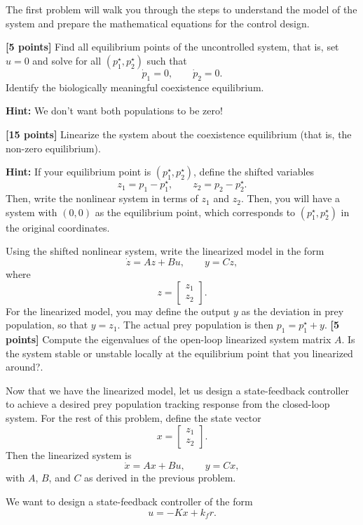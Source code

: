 \documentclass{ee122_pset}
\begin{document}
 The first problem will walk you through the steps to understand the model of the system and prepare the mathematical equations for the control design. 

\problempart \textbf{[5 points]} Find all equilibrium points of the uncontrolled system, that is, set \(u=0\) and solve for all \((p_1^\star,p_2^\star)\) such that
\[
\dot p_1=0,
\qquad
\dot p_2=0.
\]
Identify the biologically meaningful coexistence equilibrium. 

\textbf{Hint:} We don't want both populations to be zero!

\problempart \textbf{[15 points]} Linearize the system about the coexistence equilibrium (that is, the non-zero equilibrium). 

\textbf{Hint:} If your equilibrium point is $(p_1^\star, p_2^\star)$, define the shifted variables
\[
z_1=p_1-p_1^\star,
\qquad
z_2=p_2-p_2^\star.
\]
Then, write the nonlinear system in terms of \(z_1\) and \(z_2\). Then, you will have a system with $(0, 0)$ as the equilibrium point, which corresponds to $(p_1^\star, p_2^\star)$ in the original coordinates. 

Using the shifted nonlinear system, write the linearized model in the form
\[
\dot z = Az+Bu,
\qquad
y = Cz,
\]
where
\[
z=\begin{bmatrix}z_1\\ z_2\end{bmatrix}.
\]
For the linearized model, you may define the output \(y\) as the deviation in prey population, so that \(y=z_1\). The actual prey population is then \(p_1=p_1^\star+y\).
\problempart \textbf{[5 points]} Compute the eigenvalues of the open-loop linearized system matrix \(A\). Is the system stable or unstable locally at the equilibrium point that you linearized around?.

Now that we have the linearized model, let us design a state-feedback controller to achieve a desired prey population tracking response from the closed-loop system. For the rest of this problem, define the state vector
\[
x=
\begin{bmatrix}
z_1\\
z_2
\end{bmatrix}.
\]
Then the linearized system is
\[
\dot x = Ax+Bu,
\qquad
y=Cx,
\]
with $A$, $B$, and $C$ as derived in the previous problem.

We want to design a state-feedback controller of the form
\[
u=-Kx+k_f r.
\]
\end{document}

